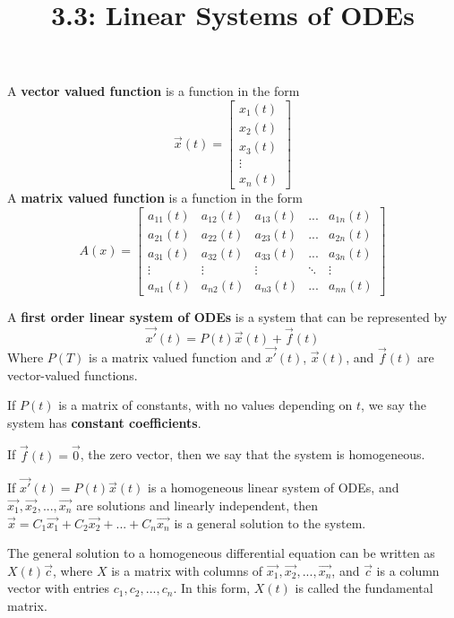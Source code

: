\documentclass{article}
\title{3.3: Linear Systems of ODEs}
\begin{document}
\maketitle
\begin{definition}
A \textbf{vector valued function} is a function in the form $$\vec{x}(t) = \begin{bmatrix}
    x_1(t)\\x_2(t)\\x_3(t)\\\vdots \\x_n(t)
\end{bmatrix}$$
A \textbf{matrix valued function} is a function in the form $$A(x) = \begin{bmatrix}
    a_{11}(t) & a_{12}(t) & a_{13}(t) & ... & a_{1n}(t)\\
    a_{21}(t) & a_{22}(t) & a_{23}(t) & ... & a_{2n}(t)\\
    a_{31}(t) & a_{32}(t) & a_{33}(t) & ... & a_{3n}(t)\\
    \vdots & \vdots & \vdots & \ddots & \vdots\\
    a_{n1}(t) & a_{n2}(t) & a_{n3}(t) & ... & a_{nn}(t)
\end{bmatrix} $$

\end{definition}

\begin{definition}
A \textbf{first order linear system of ODEs} is a system that can be represented by $$\vec{x'}(t) = P(t)\vec{x}(t) + \vec{f}(t)$$Where $P(T)$ is a matrix valued function and $\vec{x'}(t)$, $\vec{x}(t)$, and $\vec{f}(t)$ are vector-valued functions. 
\end{definition}

If $P(t)$ is a matrix of constants, with no values depending on $t$, we say the system has \textbf{constant coefficients}.

If $\vec{f}(t) = \vec{0}$, the zero vector, then we say that the system is homogeneous.

\begin{theorem}[Superposition]
If $\vec{x'}(t) = P(t)\vec{x}(t)$ is a homogeneous linear system of ODEs, and $\vec{x_1}, \vec{x_2}, ... , \vec{x_n}$ are solutions and linearly independent, then $\vec{x} = C_1\vec{x_1} + C_2\vec{x_2} + ... + C_n\vec{x_n}$ is a general solution to the system.

The general solution to a homogeneous differential equation can be written as $X(t)\vec{c}$, where $X$ is a matrix with columns of $\vec{x_1}, \vec{x_2},...,\vec{x_n}$, and $\vec{c}$ is a column vector with entries $c_1,c_2,...,c_n$. In this form, $X(t)$ is called the fundamental matrix.
\end{theorem}
\end{document}
